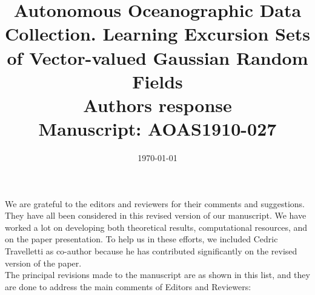 \documentclass[a4paper]{article}
\newcounter{reviewer}
\begin{document}
\title{Autonomous Oceanographic Data Collection. Learning Excursion Sets of Vector-valued Gaussian Random Fields
  \\\vspace{5mm}
 Authors response
  \\\vspace{5mm}
\small{Manuscript: AOAS1910-027}}
\author{ }

\date{\today}

\maketitle

We are grateful to the editors and reviewers for their comments and
suggestions. They have all been considered in this revised
version of our manuscript. We have worked a lot on developing both theoretical results, computational resources, and on the paper presentation. To help us in these efforts, we included Cedric Travelletti as co-author because he has contributed significantly on the revised version of the paper. \\

The principal revisions made to the manuscript are as shown in this list, and they are done to address the main comments of Editors and Reviewers:
\end{document}
